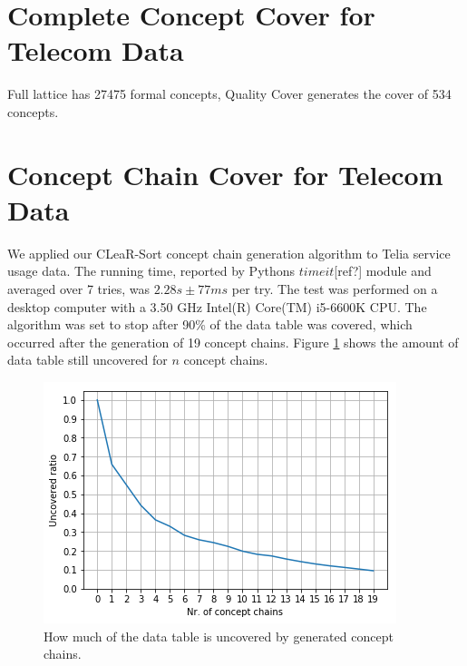 \documentclass[acmconf,authordraft]{acmart}
\begin{document}
\section{Complete Concept Cover for Telecom Data}
Full lattice has 27475 formal concepts, Quality Cover generates the cover of 534 concepts.

\section{Concept Chain Cover for Telecom Data}

We applied our CLeaR-Sort  concept chain generation algorithm to Telia service usage data. The running time, reported by Pythons $timeit$[ref?] module and averaged over 7 tries, was $2.28 s \pm 77 ms$ per try. The test was performed on a desktop computer with a 3.50 GHz Intel(R) Core(TM) i5-6600K CPU. The algorithm was set to stop after 90\% of the data table was covered, which occurred after the generation of 19 concept chains. Figure \ref{fig:cc_cover} shows the amount of data table still uncovered for $n$ concept chains.

\begin{figure}[ht]
  \centering
  \label{fig:cc_cover}
  \includegraphics[width=\linewidth]{telia_ccc}
  \caption{How much of the data table is uncovered by generated concept chains.}
\end{figure}
\end{document}
